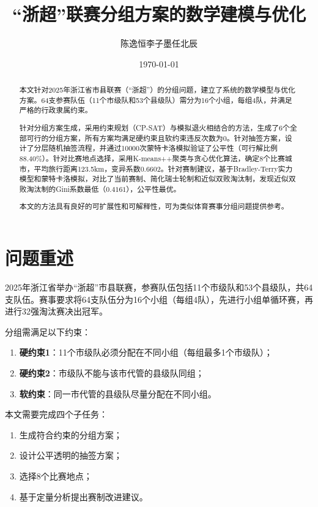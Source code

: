 \documentclass[a4paper,12pt]{article}
\title{\textbf{``浙超''联赛分组方案的数学建模与优化}}
\author{陈逸恒\quad 李子墨\quad 任北辰}
\date{\today}
\begin{document}
\maketitle

\begin{abstract}
本文针对2025年浙江省市县联赛（``浙超''）的分组问题，建立了系统的数学模型与优化方案。64支参赛队伍（11个市级队和53个县级队）需分为16个小组，每组4队，并满足严格的行政隶属约束。

针对分组方案生成，采用约束规划（CP-SAT）与模拟退火相结合的方法，生成了6个全部可行的分组方案，所有方案均满足硬约束且软约束违反次数为0。针对抽签方案，设计了分层随机抽签流程，并通过10000次蒙特卡洛模拟验证了公平性（可行解比例 $88.40\%$）。针对比赛地点选择，采用K-means++聚类与贪心优化算法，确定8个比赛城市，平均旅行距离123.5km，变异系数0.6602。针对赛制建议，基于Bradley-Terry实力模型和蒙特卡洛模拟，对比了当前赛制、简化瑞士轮制和近似双败淘汰制，发现近似双败淘汰制的Gini系数最低（$0.4161$），公平性最优。

本文的方法具有良好的可扩展性和可解释性，可为类似体育赛事分组问题提供参考。
\end{abstract}
\newpage
\tableofcontents
\newpage

\section{问题重述}

2025年浙江省举办``浙超''市县联赛，参赛队伍包括11个市级队和53个县级队，共64支队伍。赛事要求将64支队伍分为16个小组（每组4队），先进行小组单循环赛，再进行32强淘汰赛决出冠军。

分组需满足以下约束：
\begin{enumerate}
    \item \textbf{硬约束1}：11个市级队必须分配在不同小组（每组最多1个市级队）；
    \item \textbf{硬约束2}：市级队不能与该市代管的县级队同组；
    \item \textbf{软约束}：同一市代管的县级队尽量分配在不同小组。
\end{enumerate}

本文需要完成四个子任务：
\begin{enumerate}
    \item 生成符合约束的分组方案；
    \item 设计公平透明的抽签方案；
    \item 选择8个比赛地点；
    \item 基于定量分析提出赛制改进建议。
\end{enumerate}
\end{document}
